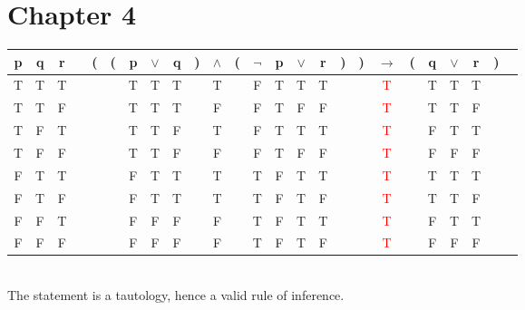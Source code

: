     \section*{Chapter 4}
\begin{Solution}{4.1}
\quad
\begin{tabular}{@{ }c@{ }@{ }c@{ }@{ }c | c@{ }@{}c@{}@{}c@{}@{ }c@{ }@{ }c@{ }@{ }c@{ }@{}c@{}@{ }c@{ }@{}c@{}@{ }c@{ }@{ }c@{ }@{ }c@{ }@{ }c@{ }@{}c@{}@{}c@{}@{ }c@{ }@{}c@{}@{ }c@{ }@{ }c@{ }@{ }c@{ }@{}c@{}@{ }c}
p & q & r &  & ( & ( & p & $\lor$ & q & ) & $\land$ & ( & $\lnot$ & p & $\lor$ & r & ) & ) & $\rightarrow$ & ( & q & $\lor$ & r & ) & \\
\hline
T & T & T &  &  &  & T & T & T &  & T &  & F & T & T & T &  &  & \textcolor{red}{T} &  & T & T & T &  & \\
T & T & F &  &  &  & T & T & T &  & F &  & F & T & F & F &  &  & \textcolor{red}{T} &  & T & T & F &  & \\
T & F & T &  &  &  & T & T & F &  & T &  & F & T & T & T &  &  & \textcolor{red}{T} &  & F & T & T &  & \\
T & F & F &  &  &  & T & T & F &  & F &  & F & T & F & F &  &  & \textcolor{red}{T} &  & F & F & F &  & \\
F & T & T &  &  &  & F & T & T &  & T &  & T & F & T & T &  &  & \textcolor{red}{T} &  & T & T & T &  & \\
F & T & F &  &  &  & F & T & T &  & T &  & T & F & T & F &  &  & \textcolor{red}{T} &  & T & T & F &  & \\
F & F & T &  &  &  & F & F & F &  & F &  & T & F & T & T &  &  & \textcolor{red}{T} &  & F & T & T &  & \\
F & F & F &  &  &  & F & F & F &  & F &  & T & F & T & F &  &  & \textcolor{red}{T} &  & F & F & F &  & \\
\end{tabular}\\
The statement is a tautology, hence a valid rule of inference.
\end{Solution}
